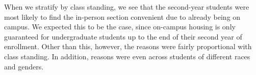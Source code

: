 When we stratify by class standing, we see that the second-year students were most likely to find the in-person section convenient due to already being on campus. We expected this to be the case, since on-campus housing is only guaranteed for undergraduate students up to the end of their second year of enrollment. Other than this, however, the reasons were fairly proportional with class standing. In addition, reasons were even across students of different races and genders.


